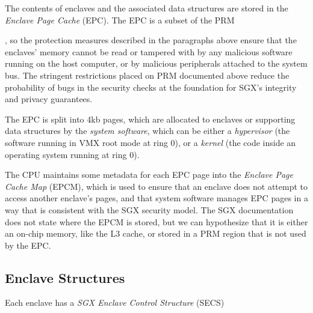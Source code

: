 
The contents of enclaves and the associated data structures are stored in the
\textit{Enclave Page Cache} (EPC). The EPC is a subset of the PRM

, so the
protection measures described in the paragraphs above ensure that the enclaves'
memory cannot be read or tampered with by any malicious software running on the
host computer, or by malicious peripherals attached to the system bus. The
stringent restrictions placed on PRM documented above reduce the probability of
bugs in the security checks at the foundation for SGX's integrity and privacy
guarantees.

The EPC is split into 4kb pages, which are allocated to enclaves or supporting
data structures by the \textit{system software}, which can be either a
\textit{hypervisor} (the software running in VMX root mode at ring 0), or a
\textit{kernel} (the code inside an operating system running at ring 0).

The CPU maintains some metadata for each EPC page into the \textit{Enclave Page
Cache Map} (EPCM), which is used to ensure that an enclave does not attempt to
access another enclave's pages, and that system software manages EPC pages in a
way that is consistent with the SGX security model. The SGX documentation does
not state where the EPCM is stored, but we can hypothesize that it is either
an on-chip memory, like the L3 cache, or stored in a PRM region that is not
used by the EPC.


\subsection{Enclave Structures}

Each enclave has a \textit{SGX Enclave Control Structure} (SECS)






